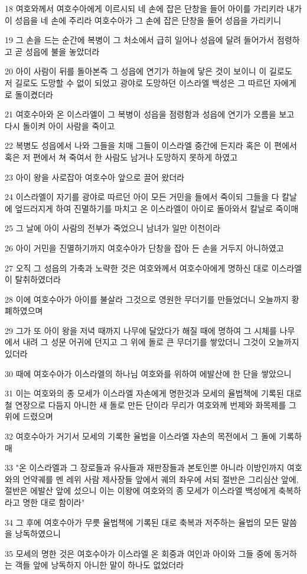 \par 18 여호와께서 여호수아에게 이르시되 네 손에 잡은 단창을 들어 아이를 가리키라 내가 이 성읍을 네 손에 주리라 여호수아가 그 손에 잡은 단창을 들어 성읍을 가리키니
\par 19 그 손을 드는 순간에 복병이 그 처소에서 급히 일어나 성읍에 달려 들어가서 점령하고 곧 성읍에 불을 놓았더라
\par 20 아이 사람이 뒤를 돌아본즉 그 성읍에 연기가 하늘에 닿은 것이 보이니 이 길로도 저 길로도 도망할 수 없이 되었고 광야로 도망하던 이스라엘 백성은 그 따르던 자에게로 돌이켰더라
\par 21 여호수아와 온 이스라엘이 그 복병이 성읍을 점령함과 성읍에 연기가 오름을 보고 다시 돌이켜 아이 사람을 죽이고
\par 22 복병도 성읍에서 나와 그들을 치매 그들이 이스라엘 중간에 든지라 혹은 이 편에서 혹은 저 편에서 쳐 죽여서 한 사람도 남거나 도망하지 못하게 하였고
\par 23 아이 왕을 사로잡아 여호수아 앞으로 끌어 왔더라
\par 24 이스라엘이 자기를 광야로 따르던 아이 모든 거민을 들에서 죽이되 그들을 다 칼날에 엎드러지게 하여 진멸하기를 마치고 온 이스라엘이 아이로 돌아와서 칼날로 죽이매
\par 25 그 날에 아이 사람의 전부가 죽었으니 남녀가 일만 이천이라
\par 26 아이 거민을 진멸하기까지 여호수아가 단창을 잡아 든 손을 거두지 아니하였고
\par 27 오직 그 성읍의 가축과 노략한 것은 여호와께서 여호수아에게 명하신 대로 이스라엘이 탈취하였더라
\par 28 이에 여호수아가 아이를 불살라 그것으로 영원한 무더기를 만들었더니 오늘까지 황폐하였으며
\par 29 그가 또 아이 왕을 저녁 때까지 나무에 달았다가 해질 때에 명하여 그 시체를 나무에서 내려 그 성문 어귀에 던지고 그 위에 돌로 큰 무더기를 쌓았더니 그것이 오늘까지 있더라
\par 30 때에 여호수아가 이스라엘의 하나님 여호와를 위하여 에발산에 한 단을 쌓았으니
\par 31 이는 여호와의 종 모세가 이스라엘 자손에게 명한것과 모세의 율법책에 기록된 대로 철 연장으로 다듬지 아니한 새 돌로 만든 단이라 무리가 여호와께 번제와 화목제를 그 위에 드렸으며
\par 32 여호수아가 거기서 모세의 기록한 율법을 이스라엘 자손의 목전에서 그 돌에 기록하매
\par 33 "온 이스라엘과 그 장로들과 유사들과 재판장들과 본토인뿐 아니라 이방인까지 여호와의 언약궤를 멘 레위 사람 제사장들 앞에서 궤의 좌우에 서되 절반은 그리심산 앞에, 절반은 에발산 앞에 섰으니 이는 이왕에 여호와의 종 모세가 이스라엘 백성에게 축복하라고 명한 대로 함이라"
\par 34 그 후에 여호수아가 무릇 율법책에 기록된 대로 축복과 저주하는 율법의 모든 말씀을 낭독하였으니
\par 35 모세의 명한 것은 여호수아가 이스라엘 온 회중과 여인과 아이와 그들 중에 동거하는 객들 앞에 낭독하지 아니한 말이 하나도 없었더라

